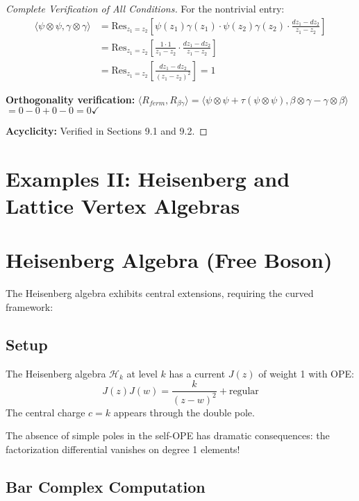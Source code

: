 \begin{proof}[Complete Verification of All Conditions]
For the nontrivial entry:
\begin{align}
\langle\psi \otimes \psi, \gamma \otimes \gamma\rangle &= \text{Res}_{z_1=z_2}\left[\psi(z_1)\gamma(z_1) \cdot \psi(z_2)\gamma(z_2) \cdot \frac{dz_1-dz_2}{z_1-z_2}\right]\\
&= \text{Res}_{z_1=z_2}\left[\frac{1 \cdot 1}{z_1-z_2} \cdot \frac{dz_1-dz_2}{z_1-z_2}\right]\\
&= \text{Res}_{z_1=z_2}\left[\frac{dz_1-dz_2}{(z_1-z_2)^2}\right] = 1
\end{align}

\textbf{Orthogonality verification:}
$\langle R_{ferm}, R_{\beta\gamma}\rangle = \langle\psi \otimes \psi + \tau(\psi \otimes \psi), \beta \otimes \gamma - \gamma \otimes \beta\rangle$
$= 0 - 0 + 0 - 0 = 0 \checkmark$

\textbf{Acyclicity:} Verified in Sections 9.1 and 9.2.
\end{proof}
 


\section{Examples II: Heisenberg and Lattice Vertex Algebras}
 
\section{Heisenberg Algebra (Free Boson)}
 
The Heisenberg algebra exhibits central extensions, requiring the curved framework:
 
\subsection{Setup}
 
\begin{definition}
The Heisenberg algebra $\mathcal{H}_k$ at level $k$ has a current $J(z)$ of weight 1 with OPE:
\[
J(z)J(w) = \frac{k}{(z-w)^2} + \text{regular}
\]
The central charge $c = k$ appears through the double pole.
\end{definition}
 
\begin{remark}
The absence of simple poles in the self-OPE has dramatic consequences: the factorization differential 
vanishes on degree 1 elements!
\end{remark}
 
\subsection{Bar Complex Computation}
 
